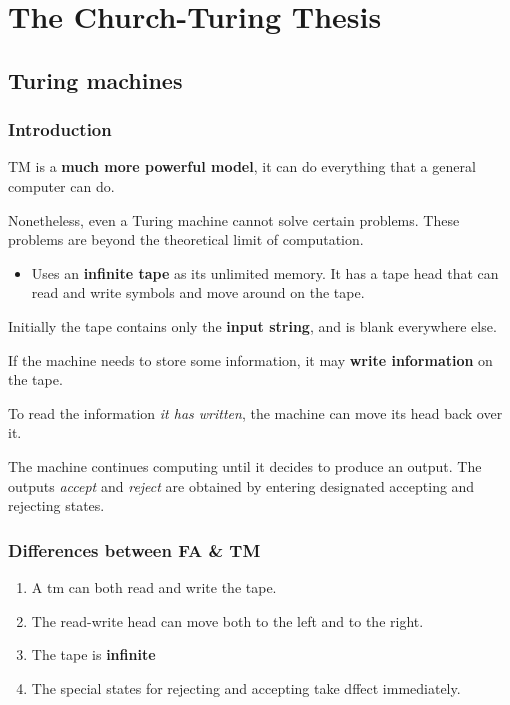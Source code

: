 \documentclass[11pt]{article}
\author{Tianchang WANG}
\date{\today}
\title{}
\begin{document}
\tableofcontents

\section{The Church-Turing Thesis}
\label{sec:orgbbf0803}
\subsection{Turing machines}
\label{sec:org84f11b0}
\subsubsection{Introduction}
\label{sec:org5213146}
TM is a \textbf{much more powerful model}, it can do everything that a general computer can do. 

Nonetheless, even a Turing machine cannot solve certain problems. These problems are beyond the theoretical limit of computation.

\begin{itemize}
\item Uses an \textbf{infinite tape} as its unlimited memory. It has a tape head that can read and write symbols and move around on the tape.
\end{itemize}

Initially the tape contains only the \textbf{input string}, and is blank everywhere else. 

If the machine needs to store some information, it may \textbf{write information} on the tape. 

To read the information \emph{it has written}, the machine can move its head back over it. 

The machine continues computing until it decides to produce an output. The outputs \emph{accept} and \emph{reject} are obtained by entering designated accepting and rejecting states. 
\subsubsection{Differences between FA \& TM}
\label{sec:orgc769ac6}
\begin{enumerate}
\item A tm can both read and write the tape.
\item The read-write head can move both to the left and to the right.
\item The tape is \textbf{infinite}
\item The special states for rejecting and accepting take dffect immediately.
\end{enumerate}
\end{document}
